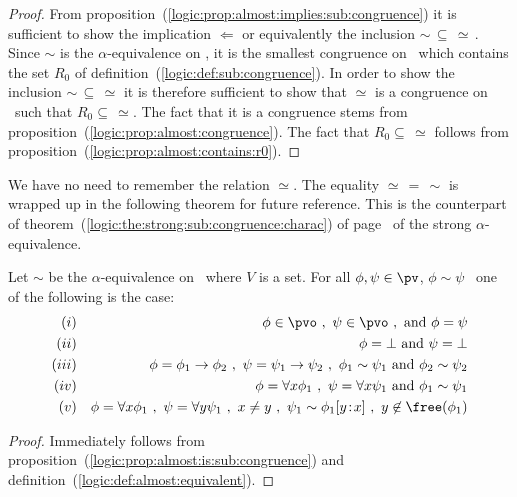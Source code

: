 \noindent
\begin{proof}
From proposition~(\ref{logic:prop:almost:implies:sub:congruence}) it
is sufficient to show the implication $\Leftarrow$ or equivalently
the inclusion $\sim\,\subseteq\,\simeq\,$. Since $\sim$ is the 
$\alpha$-equivalence on \pv, it is the smallest congruence on
\pv\ which contains the set $R_{0}$ of
definition~(\ref{logic:def:sub:congruence}). In order to show the
inclusion $\sim\,\subseteq\,\simeq$ it is therefore sufficient to
show that $\simeq$ is a congruence on \pv\ such that
$R_{0}\subseteq\,\simeq$. The fact that it is a congruence stems
from proposition~(\ref{logic:prop:almost:congruence}). The fact that
$R_{0}\subseteq\,\simeq$ follows from
proposition~(\ref{logic:prop:almost:contains:r0}).
\end{proof}

We have no need to remember the relation $\simeq$. The equality
$\simeq\,=\,\sim$ is wrapped up in the following theorem for future
reference. This is the counterpart of
theorem~(\ref{logic:the:strong:sub:congruence:charac}) of
page~\pageref{logic:the:strong:sub:congruence:charac} of the strong $\alpha$-equivalence.

\begin{theorem}\label{logic:the:sub:congruence:charac}
Let $\sim$ be the $\alpha$-equivalence on \pv\ where $V$ is a
set. For all $\phi,\psi\in\pv$, $\phi\sim\psi$ \ifand\ one of the
following is the case:
    \begin{eqnarray*}
    (i)&&\phi\in\pvo\ ,\ \psi\in\pvo\ ,\ \mbox{and}\ \phi=\psi\\
    (ii)&&\phi=\bot\ \mbox{and}\ \psi=\bot\\
    (iii)&&\phi=\phi_{1}\to\phi_{2}\ ,\ \psi=\psi_{1}\to\psi_{2}\ ,\
    \phi_{1}\sim\psi_{1}\ \mbox{and}\ \phi_{2}\sim\psi_{2}\\
    (iv)&&\phi=\forall x\phi_{1}\ ,\ \psi=\forall x\psi_{1}\ \mbox{and}\ \phi_{1}\sim\psi_{1}\\
    (v)&&\phi=\forall x\phi_{1}\ ,\ \psi=\forall y\psi_{1}\ ,\ x\neq y\ ,\
    \psi_{1}\sim \phi_{1}[y\!:\!x]\ ,\ y\not\in\free(\phi_{1})
    \end{eqnarray*}
\end{theorem}

\noindent
\begin{proof}
Immediately follows from
proposition~(\ref{logic:prop:almost:is:sub:congruence}) and
definition~(\ref{logic:def:almost:equivalent}).
\end{proof}
